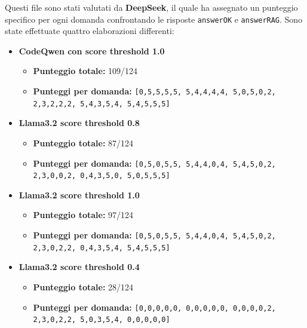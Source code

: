 \documentclass[12pt,a4paper,openright,twoside]{book}
\begin{document}
Questi file sono stati valutati da \textbf{DeepSeek}, il quale ha assegnato un punteggio specifico per ogni domanda confrontando le risposte \texttt{answerOK} e \texttt{answerRAG}. Sono state effettuate quattro elaborazioni differenti:

\begin{itemize}[leftmargin=*, label={--}]
    \item \textbf{CodeQwen con score threshold 1.0}
    \begin{itemize}[leftmargin=*, label={$\bullet$}]
        \item \textbf{Punteggio totale:} 109/124
        \item \textbf{Punteggi per domanda:}
        \texttt{[0,5,5,5,5, 5,4,4,4,4, 5,0,5,0,2, 2,3,2,2,2, 5,4,3,5,4, 5,4,5,5,5]}
    \end{itemize}

    \item \textbf{Llama3.2 score threshold 0.8}
    \begin{itemize}[leftmargin=*, label={$\bullet$}]
        \item \textbf{Punteggio totale:} 87/124
        \item \textbf{Punteggi per domanda:}
        \texttt{[0,5,0,5,5, 5,4,4,0,4, 5,4,5,0,2, 2,3,0,0,2, 0,4,3,5,0, 5,0,5,5,5]}
    \end{itemize}

    \item \textbf{Llama3.2 score threshold 1.0}
    \begin{itemize}[leftmargin=*, label={$\bullet$}]
        \item \textbf{Punteggio totale:} 97/124
        \item \textbf{Punteggi per domanda:}
        \texttt{[0,5,0,5,5, 5,4,4,0,4, 5,4,5,0,2, 2,3,0,2,2, 0,4,3,5,4, 5,4,5,5,5]}
    \end{itemize}

    \item \textbf{Llama3.2 score threshold 0.4}
    \begin{itemize}[leftmargin=*, label={$\bullet$}]
        \item \textbf{Punteggio totale:} 28/124
        \item \textbf{Punteggi per domanda:}
        \texttt{[0,0,0,0,0, 0,0,0,0,0, 0,0,0,0,2, 2,3,0,2,2, 5,0,3,5,4, 0,0,0,0,0]}
    \end{itemize}
\end{itemize}
\end{document}
